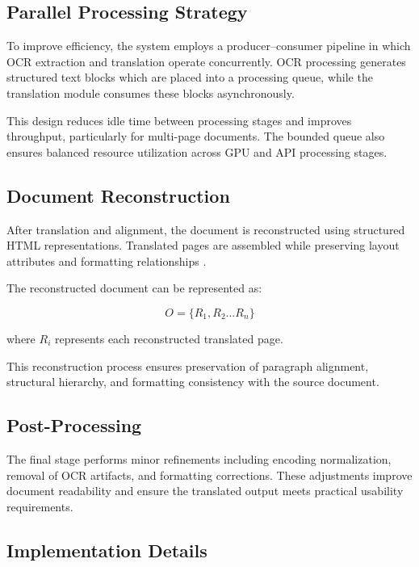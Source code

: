 \documentclass[11pt]{article}
\begin{document}
\subsection{Parallel Processing Strategy}

To improve efficiency, the system employs a producer–consumer pipeline in which OCR extraction and translation operate concurrently. OCR processing generates structured text blocks which are placed into a processing queue, while the translation module consumes these blocks asynchronously.

This design reduces idle time between processing stages and improves throughput, particularly for multi-page documents. The bounded queue also ensures balanced resource utilization across GPU and API processing stages.

\subsection{Document Reconstruction}

After translation and alignment, the document is reconstructed using structured HTML representations. Translated pages are assembled while preserving layout attributes and formatting relationships \cite{xu_layoutlm:_2020,xu_layoutlmv2:_2022,huang_layoutlmv3:_2022,appalaraju_docformer:_2021}.

The reconstructed document can be represented as:

\begin{equation}
O = \{R_1, R_2 \dots R_n\}
\end{equation}

where $R_i$ represents each reconstructed translated page.

This reconstruction process ensures preservation of paragraph alignment, structural hierarchy, and formatting consistency with the source document.

\subsection{Post-Processing}

The final stage performs minor refinements including encoding normalization, removal of OCR artifacts, and formatting corrections. These adjustments improve document readability and ensure the translated output meets practical usability requirements.

\subsection{Implementation Details}
\end{document}
